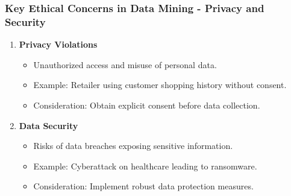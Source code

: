 \documentclass[aspectratio=169]{beamer}
\begin{document}
\begin{frame}[fragile]
    \frametitle{Key Ethical Concerns in Data Mining - Privacy and Security}
    \begin{enumerate}
        \item \textbf{Privacy Violations}
        \begin{itemize}
            \item Unauthorized access and misuse of personal data.
            \item Example: Retailer using customer shopping history without consent.
            \item Consideration: Obtain explicit consent before data collection.
        \end{itemize}
        
        \item \textbf{Data Security}
        \begin{itemize}
            \item Risks of data breaches exposing sensitive information.
            \item Example: Cyberattack on healthcare leading to ransomware.
            \item Consideration: Implement robust data protection measures.
        \end{itemize}
    \end{enumerate}
\end{frame}
\end{document}
